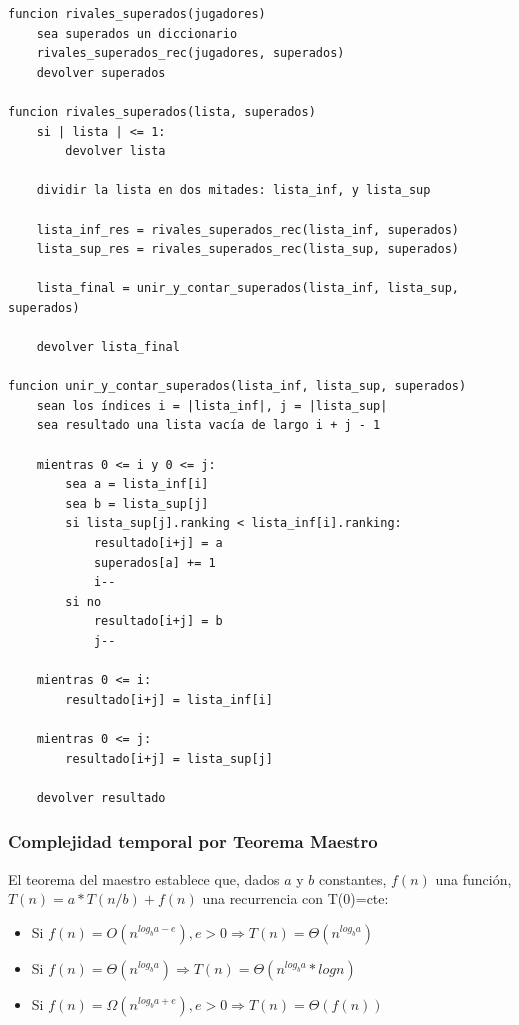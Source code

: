 \documentclass[titlepage,a4paper]{article}
\begin{document}
\begin{verbatim}
funcion rivales_superados(jugadores)
    sea superados un diccionario
    rivales_superados_rec(jugadores, superados)
    devolver superados

funcion rivales_superados(lista, superados)
    si | lista | <= 1:
        devolver lista

    dividir la lista en dos mitades: lista_inf, y lista_sup

    lista_inf_res = rivales_superados_rec(lista_inf, superados)
    lista_sup_res = rivales_superados_rec(lista_sup, superados)

    lista_final = unir_y_contar_superados(lista_inf, lista_sup, superados)

    devolver lista_final

funcion unir_y_contar_superados(lista_inf, lista_sup, superados)
    sean los índices i = |lista_inf|, j = |lista_sup|
    sea resultado una lista vacía de largo i + j - 1
    
    mientras 0 <= i y 0 <= j:
        sea a = lista_inf[i]
        sea b = lista_sup[j]
        si lista_sup[j].ranking < lista_inf[i].ranking:
            resultado[i+j] = a
            superados[a] += 1
            i--
        si no
            resultado[i+j] = b
            j--

    mientras 0 <= i:
        resultado[i+j] = lista_inf[i]

    mientras 0 <= j:
        resultado[i+j] = lista_sup[j]

    devolver resultado
\end{verbatim}

\subsubsection{Complejidad temporal por Teorema Maestro}
\label{sec:org857aa16}

El teorema del maestro establece que, dados \(a\) y \(b\) constantes, \(f(n)\) una función, \(T(n) = a * T(n/b) + f(n)\) una recurrencia con T(0)=cte:
\begin{itemize}
\item Si \(f(n) = O(n^{log_b a - e}), e > 0 \Rightarrow T(n) = \Theta(n^{log_b a})\)
\item Si \(f(n) = \Theta(n^{log_b a}) \Rightarrow T(n) = \Theta(n^{log_b a} * log n)\)
\item Si \(f(n) = \Omega(n^{log_b a + e}), e > 0 \Rightarrow T(n) = \Theta(f(n))\)
\end{itemize}
\end{document}

